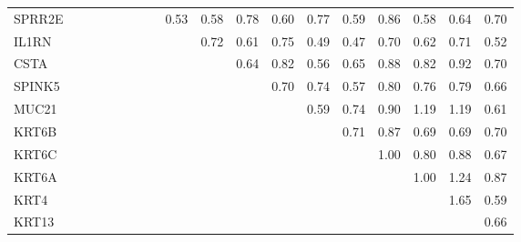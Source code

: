 \begin{longtable}{lrrrrrrrrrrrrrrrrr}
SPRR2E &             &           &              &             &              &              &              &        0.53 &       0.58 &         0.78 &        0.60 &        0.77 &        0.59 &        0.86 &       0.58 &        0.64 &        0.70 \\
IL1RN  &             &           &              &             &              &              &              &             &       0.72 &         0.61 &        0.75 &        0.49 &        0.47 &        0.70 &       0.62 &        0.71 &        0.52 \\
CSTA   &             &           &              &             &              &              &              &             &            &         0.64 &        0.82 &        0.56 &        0.65 &        0.88 &       0.82 &        0.92 &        0.70 \\
SPINK5 &             &           &              &             &              &              &              &             &            &              &        0.70 &        0.74 &        0.57 &        0.80 &       0.76 &        0.79 &        0.66 \\
MUC21  &             &           &              &             &              &              &              &             &            &              &             &        0.59 &        0.74 &        0.90 &       1.19 &        1.19 &        0.61 \\
KRT6B  &             &           &              &             &              &              &              &             &            &              &             &             &        0.71 &        0.87 &       0.69 &        0.69 &        0.70 \\
KRT6C  &             &           &              &             &              &              &              &             &            &              &             &             &             &        1.00 &       0.80 &        0.88 &        0.67 \\
KRT6A  &             &           &              &             &              &              &              &             &            &              &             &             &             &             &       1.00 &        1.24 &        0.87 \\
KRT4   &             &           &              &             &              &              &              &             &            &              &             &             &             &             &            &        1.65 &        0.59 \\
KRT13  &             &           &              &             &              &              &              &             &            &              &             &             &             &             &            &             &        0.66 \\
\end{longtable}


